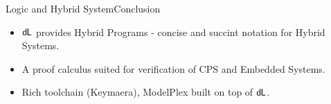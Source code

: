 \documentclass{beamer}
\newcommand{\dL}{\text{\upshape\textsf{d{\kern-0.05em}L}}}
\begin{document}
\begin{frame}{Logic and Hybrid System}{Conclusion}
  \begin{itemize}
    \item $\dL$ provides Hybrid Programs - concise and succint notation for Hybrid Systems.
      \pause
    \item A proof calculus suited for verification of CPS and Embedded Systems.
      \pause
    \item Rich toolchain (Keymaera), ModelPlex built on top of $\dL$.
  \end{itemize}
\end{frame}
\end{document}
